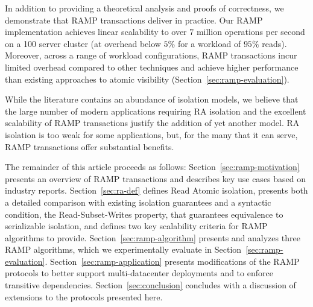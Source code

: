 In addition to providing a theoretical analysis and proofs of
correctness, we demonstrate that RAMP transactions deliver in
practice. Our RAMP implementation achieves linear scalability to over
$7$ million operations per second on a 100 server cluster (at overhead
below $5\%$ for a workload of $95\%$ reads). Moreover, across a range
of workload configurations, RAMP transactions incur limited overhead
compared to other techniques and achieve higher performance than
existing approaches to atomic visibility
(Section~\ref{sec:ramp-evaluation}).

While the literature contains an abundance of isolation models, we
believe that the large number of modern applications requiring RA
isolation and the excellent scalability of RAMP transactions justify
the addition of yet another model. RA isolation is too weak for some
applications, but, for the many that it can serve, RAMP transactions
offer substantial benefits.

The remainder of this article proceeds as follows:
Section~\ref{sec:ramp-motivation} presents an overview of RAMP
transactions and describes key use cases based on industry
reports. Section~\ref{sec:ra-def} defines Read Atomic isolation,
presents both a detailed comparison with existing isolation guarantees
and a syntactic condition, the Read-Subset-Writes property, that
guarantees equivalence to serializable isolation, and defines two key
scalability criteria for RAMP algorithms to
provide. Section~\ref{sec:ramp-algorithm} presents and analyzes three
RAMP algorithms, which we experimentally evaluate in
Section~\ref{sec:ramp-evaluation}. Section~\ref{sec:ramp-application}
presents modifications of the RAMP protocols to better support
multi-datacenter deployments and to enforce transitive
dependencies. Section~\ref{sec:conclusion} concludes with a discussion
of extensions to the protocols presented here.


















